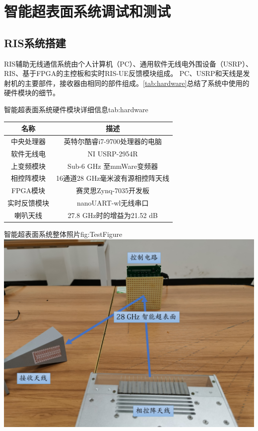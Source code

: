 \documentclass[supercite]{HustGraduPaper}
\begin{document}
\section{智能超表面系统调试和测试}\label{sec:test}

\subsection{RIS系统搭建}

RIS辅助无线通信系统由个人计算机（PC）、通用软件无线电外围设备（USRP）、RIS、基于FPGA的主控板和实时RIS-UE反馈模块组成。
PC、USRP和天线是发射机的主要部件，接收器由相同的部件组成。\autoref{tab:hardware}总结了系统中使用的硬件模块的细节。

\begin{generaltab}{智能超表面系统硬件模块详细信息}{tab:hardware}
	\begin{tabular}{cc}
		\toprule
		名称             & 描述                           \\ \midrule
		中央处理器       & 英特尔酷睿i7-9700处理器的电脑    \\
		软件无线电       & NI USRP-2954R                  \\ 
		上变频模块       & Sub-6 GHz 至mmWare变频器        \\
		相控阵模块       & 16通道28 GHz毫米波有源相控阵天线 \\
		FPGA模块        & 赛灵思Zynq-7035开发板            \\
		实时反馈模块     & nanoUART-wl无线串口             \\
		喇叭天线        & 27.8 GHz时的增益为21.52 dB       \\ 
		\bottomrule
	\end{tabular}
\end{generaltab}

\begin{generalfig}[htb]{智能超表面系统整体照片}{fig:TestFigure}
	\includegraphics[width=0.8\linewidth]{Figures/TestFigure.pdf}
\end{generalfig}
\end{document}
